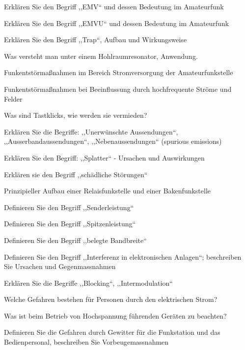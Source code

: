 \documentclass[avery5371,grid,frame,a4paper]{flashcards}
\newcommand\question[2]{
  \begin{flashcard}[{\chap} -- #1]{#2}\end{flashcard}
}
\newcommand\class[1]{{\footnotesize [Klassen: #1]}}
\begin{document}
\question{87}{Erklären Sie den Begriff ,,EMV`` und dessen Bedeutung im Amateurfunk}
\question{88}{Erklären Sie den Begriff ,,EMVU`` und dessen Bedeutung im Amateurfunk}
\question{89}{Erklären Sie den Begriff ,,Trap``, Aufbau und Wirkungsweise}
\question{90}{Was versteht man unter einem Hohlraumresonator, Anwendung.}
\question{91}{Funkentstörmaßnahmen im Bereich Stromversorgung der Amateurfunkstelle}
\question{92}{Funkentstörmaßnahmen bei Beeinflussung durch hochfrequente Ströme und Felder}
\question{93}{Was sind Tastklicks, wie werden sie vermieden?}
\question{94}{Erklären Sie die Begriffe: ,,Unerwünschte Aussendungen``, ,,Ausserbandaussendungen``, ,,Nebenaussendungen`` (spurious emissions)}
\question{95}{Erklären Sie den Begriff: ,,Splatter`` - Ursachen und Auswirkungen}
\question{96}{Erklären sie den Begriff ,,schädliche Störungen``}
\question{97}{Prinzipieller Aufbau einer Relaisfunkstelle und einer Bakenfunkstelle}
\question{98}{Definieren Sie den Begriff ,,Senderleistung``}
\question{99}{Definieren Sie den Begriff ,,Spitzenleistung``}
\question{100}{Definieren Sie den Begriff ,,belegte Bandbreite``}
\question{101}{Definieren Sie den Begriff ,,Interferenz in elektronischen Anlagen``; beschreiben Sie Ursachen und Gegenmassnahmen}
\question{102}{Erklären Sie die Begriffe ,,Blocking``, ,,Intermodulation``}
\question{103}{Welche Gefahren bestehen für Personen durch den elektrischen Strom?}
\question{104}{Was ist beim Betrieb von Hochspannung führenden Geräten zu beachten?}
\question{105}{Definieren Sie die Gefahren durch Gewitter für die Funkstation und das Bedienpersonal, beschreiben Sie Vorbeugemassnahmen}

\def\chap{Technische Grundlagen \class{3,4}}
\end{document}
